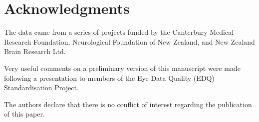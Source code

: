 \documentclass[jou,a4paper]{apa6}
\begin{document}
\section{Acknowledgments}
The data came from a series of projects funded by the Canterbury Medical Research Foundation, Neurological Foundation of New Zealand, and New Zealand Brain Research Ltd.

Very useful comments on a preliminary version of this manuscript were made following a presentation to members of the Eye Data Quality (EDQ) Standardisation Project.

The authors declare that there is no conflict of interest regarding the
publication of this paper.


\end{document}

